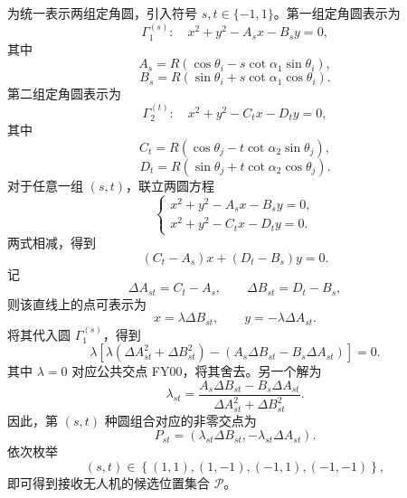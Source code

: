 \documentclass[UTF-8,a4paper,zihao=-4]{ctexart}
\begin{document}
为统一表示两组定角圆，引入符号
$s,t\in\{-1,1\}$。第一组定角圆表示为
\begin{equation}
\Gamma_1^{(s)}:
\quad
x^2+y^2-A_sx-B_sy=0,
\end{equation}
其中
\begin{equation}
A_s
=
R\left(
\cos\theta_i-s\cot\alpha_1\sin\theta_i
\right),
\end{equation}
\begin{equation}
B_s
=
R\left(
\sin\theta_i+s\cot\alpha_1\cos\theta_i
\right).
\end{equation}
第二组定角圆表示为
\begin{equation}
\Gamma_2^{(t)}:
\quad
x^2+y^2-C_tx-D_ty=0,
\end{equation}
其中
\begin{equation}
C_t
=
R\left(
\cos\theta_j-t\cot\alpha_2\sin\theta_j
\right),
\end{equation}
\begin{equation}
D_t
=
R\left(
\sin\theta_j+t\cot\alpha_2\cos\theta_j
\right).
\end{equation}
对于任意一组 $(s,t)$，联立两圆方程
\begin{equation}
\begin{cases}
x^2+y^2-A_sx-B_sy=0,\\
x^2+y^2-C_tx-D_ty=0.
\end{cases}
\end{equation}
两式相减，得到
\begin{equation}
(C_t-A_s)x+(D_t-B_s)y=0.
\end{equation}
记
\begin{equation}
\Delta A_{st}=C_t-A_s,\qquad
\Delta B_{st}=D_t-B_s,
\end{equation}
则该直线上的点可表示为
\begin{equation}
x=\lambda\Delta B_{st},\qquad
y=-\lambda\Delta A_{st}.
\end{equation}
将其代入圆 $\Gamma_1^{(s)}$，得到
\begin{equation}
\lambda
\left[
\lambda
\left(
\Delta A_{st}^2+\Delta B_{st}^2
\right)
-
\left(
A_s\Delta B_{st}
-
B_s\Delta A_{st}
\right)
\right]
=0.
\end{equation}
其中 $\lambda=0$ 对应公共交点 FY00，将其舍去。另一个解为
\begin{equation}
\lambda_{st}
=
\frac{
A_s\Delta B_{st}-B_s\Delta A_{st}
}{
\Delta A_{st}^2+\Delta B_{st}^2
}.
\end{equation}
因此，第 $(s,t)$ 种圆组合对应的非零交点为
\begin{equation}
P_{st}
=
\left(
\lambda_{st}\Delta B_{st},
-\lambda_{st}\Delta A_{st}
\right).
\end{equation}
依次枚举
\begin{equation}
(s,t)\in
\left\{
(1,1),(1,-1),(-1,1),(-1,-1)
\right\},
\end{equation}
即可得到接收无人机的候选位置集合 $\mathcal P$。
\end{document}

